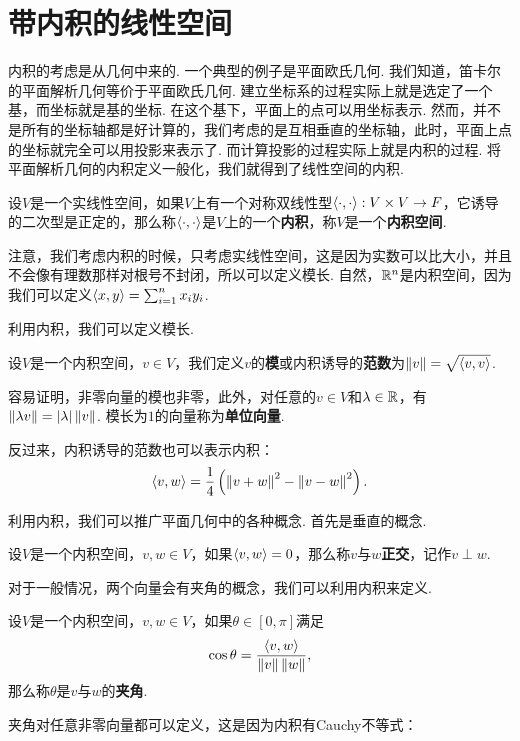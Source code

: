 \section{带内积的线性空间}
内积的考虑是从几何中来的. 一个典型的例子是平面欧氏几何. 我们知道，笛卡尔的平面解析几何等价于平面欧氏几何. 建立坐标系的过程实际上就是选定了一个基，而坐标就是基的坐标. 在这个基下，平面上的点可以用坐标表示. 然而，并不是所有的坐标轴都是好计算的，我们考虑的是互相垂直的坐标轴，此时，平面上点的坐标就完全可以用投影来表示了. 而计算投影的过程实际上就是内积的过程. 将平面解析几何的内积定义一般化，我们就得到了线性空间的内积. 


\begin{definition}[内积]
设$V$是一个实线性空间，如果$V$上有一个对称双线性型$\left\langle{\cdot},{\cdot}\right\rangle:V\times V\to F$，它诱导的二次型是正定的，那么称$\left\langle{\cdot},{\cdot}\right\rangle$是$V$上的一个\textbf{内积}，称$V$是一个\textbf{内积空间}. 
\end{definition}
注意，我们考虑内积的时候，只考虑实线性空间，这是因为实数可以比大小，并且不会像有理数那样对根号不封闭，所以可以定义模长. 自然，$\mathbb{R}^n$是内积空间，因为我们可以定义$\left\langle{x},{y}\right\rangle=\sum_{i=1}^n x_iy_i$. 

利用内积，我们可以定义模长. 

\begin{definition}[模]
设$V$是一个内积空间，$v\in V$，我们定义$v$的\textbf{模}或内积诱导的\textbf{范数}为$\left\|v\right\|=\sqrt{\left\langle{v},{v}\right\rangle}$.
\end{definition}

容易证明，非零向量的模也非零，此外，对任意的$v\in V$和$\lambda\in\mathbb{R}$，有$\left\|\lambda v\right\|=|\lambda|\left\|v\right\|$. 模长为$1$的向量称为\textbf{单位向量}.

反过来，内积诱导的范数也可以表示内积：
\begin{equation}
    \left\langle{v},{w}\right\rangle=\frac{1}{4}\left(\left\|v+w\right\|^2-\left\|v-w\right\|^2\right).\label{eq:inner}
\end{equation}

利用内积，我们可以推广平面几何中的各种概念. 首先是垂直的概念. 

\begin{definition}[正交]
设$V$是一个内积空间，$v,w\in V$，如果$\left\langle{v},{w}\right\rangle=0$，那么称$v$与$w$\textbf{正交}，记作$v\perp w$.
\end{definition}

对于一般情况，两个向量会有夹角的概念，我们可以利用内积来定义. 

\begin{definition}[夹角]
设$V$是一个内积空间，$v,w\in V$，如果$\theta\in[0,\pi]$满足
\[
    \cos\theta=\frac{\left\langle{v},{w}\right\rangle}{\left\|v\right\|\left\|w\right\|},
\]
那么称$\theta$是$v$与$w$的\textbf{夹角}. 
\end{definition}
夹角对任意非零向量都可以定义，这是因为内积有Cauchy不等式：

